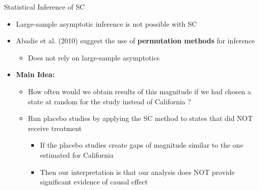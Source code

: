 \documentclass[hyperref={pdfpagelabels=false}]{beamer}
\begin{document}
\begin{frame}{Statistical Inference of SC}
\begin{itemize}
\item Large-sample asymptotic inference is not possible with SC
\vspace{0.2cm}
\item Abadie et al. (2010) suggest the use of \textbf{permutation methods} for inference 
\vspace{0.2cm}
	\begin{itemize}
	\item Does not rely on large-sample asymptotics
\end{itemize}
\vspace{0.2cm}
\item \textbf{Main Idea:} 
\vspace{0.2cm}
\begin{itemize}
\item How often would we obtain results of this magnitude if we had chosen a state at random for the study instead of California ?
\vspace{0.2cm}

\item Run placebo studies by applying the SC method to states that did NOT receive treatment
\vspace{0.2cm}
\begin{itemize}
\item  If the placebo studies create gaps of magnitude similar to the one estimated for California 
\vspace{0.2cm}
\item Then our interpretation is that
our analysis does NOT provide significant evidence of causal effect
\end{itemize}
\end{itemize}
\end{itemize}
\end{frame}
\end{document}
